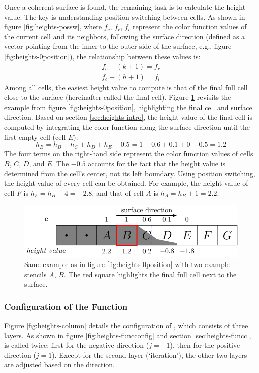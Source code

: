 Once a coherent surface is found, the remaining task is to calculate the height value. The key is understanding position switching between cells. As shown in figure \ref{fig:heights-possw}, where $f_c$, $f_r$, $f_l$ represent the color function values of the current cell and its neighbors, following the surface direction (defined as a vector pointing from the inner to the outer side of the surface, e.g., figure \ref{fig:heights-0position}), the relationship between these values is:
\begin{align}
    f_c - (k+1) = f_r\\
    f_c + (h+1) = f_l
\end{align}
Among all cells, the easiest height value to compute is that of the final full cell close to the surface (hereinafter called the final cell). Figure \ref{fig:heights-hvcomp} revisits the example from figure \ref{fig:heights-0position}, highlighting the final cell and surface direction. Based on section \ref{sec:heights-intro}, the height value of the final cell is computed by integrating the color function along the surface direction until the first empty cell (cell $E$):
\begin{equation}
    h_B = h_B + h_C + h_D + h_E - 0.5 = 1 + 0.6 + 0.1 + 0 - 0.5 = 1.2
\end{equation}
The four terms on the right-hand side represent the color function values of cells $B$, $C$, $D$, and $E$. The $-0.5$ accounts for the fact that the height value is determined from the cell’s center, not its left boundary. Using position switching, the height value of every cell can be obtained. For example, the height value of cell $F$ is $h_F = h_B - 4 = -2.8$, and that of cell $A$ is $h_A = h_B + 1 = 2.2$.

\begin{figure}
    \centering
    \includegraphics{./image/heights-h/hvcomp}
    \caption{Same example as in figure \ref{fig:heights-0position} with two example stencils $A$, $B$. The red square highlights the final full cell next to the surface.}
    \label{fig:heights-hvcomp}
\end{figure}

\subsubsection{Configuration of the Function}
Figure \ref{fig:heights-column} details the configuration of , which consists of three layers. As shown in figure \ref{fig:heights-funcconfig} and section \ref{sec:heights-funcc},  is called twice: first for the negative direction ($j=-1$), then for the positive direction ($j=1$). Except for the second layer (`iteration'), the other two layers are adjusted based on the direction.

